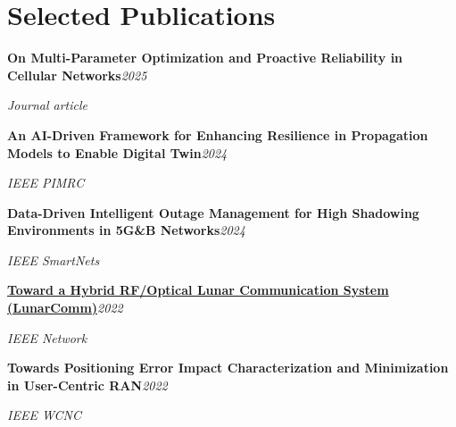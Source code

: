 \documentclass[9pt,letterpaper]{extarticle}
\newcommand{\entry}[2]{\Needspace{4\baselineskip}\textbf{#1}\hfill\textit{#2}\par}
\begin{document}
\section{Selected Publications}
\entry{On Multi-Parameter Optimization and Proactive Reliability in Cellular Networks}{2025}
\textit{Journal article}\par
\entry{An AI-Driven Framework for Enhancing Resilience in Propagation Models to Enable Digital Twin}{2024}
\textit{IEEE PIMRC}\par
\entry{Data-Driven Intelligent Outage Management for High Shadowing Environments in 5G\&B Networks}{2024}
\textit{IEEE SmartNets}\par
\entry{\href{https://arxiv.org/abs/2203.15899}{Toward a Hybrid RF/Optical Lunar Communication System (LunarComm)}}{2022}
\textit{IEEE Network}\par
\entry{Towards Positioning Error Impact Characterization and Minimization in User-Centric RAN}{2022}
\textit{IEEE WCNC}\par
\end{document}
